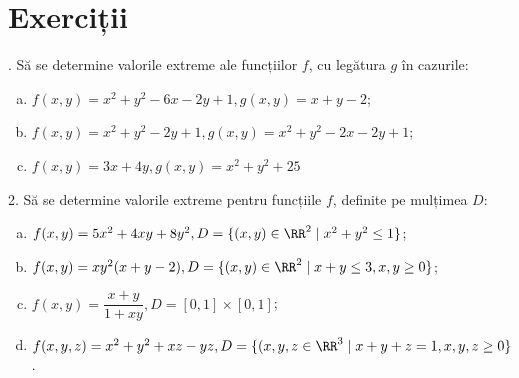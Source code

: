 
\section{Exerciții}

\indent{}. Să se determine valorile extreme ale funcțiilor $ f $,
cu legătura $ g $ în cazurile:
\begin{enumerate}[(a)]
\item $ f(x, y) = x^2 + y^2 - 6x - 2y + 1, g(x, y) = x + y - 2 $;
\item $ f(x, y) = x^2 + y^2 - 2y + 1, g(x, y) = x^2 + y^2 - 2x - 2y + 1 $;
\item $ f(x, y) = 3x + 4y, g(x, y) = x^2 + y^2 + 25 $
\end{enumerate}

\vspace{1cm}

2. Să se determine valorile extreme pentru funcțiile $ f $, definite pe
mulțimea $ D $:
\begin{enumerate}[(a)]
\item $ f(x, y) = 5x^2 + 4xy + 8y^2, D = \{(x, y) \in \RR^2 \mid x^2 + y^2 \leq 1 \} $;
\item $ f(x, y) = xy^2(x + y - 2), D = \{(x, y) \in \RR^2 \mid x + y \leq 3, x, y \geq 0 \} $;
\item $ f(x, y) = \dfrac{x + y}{1 + xy}, D = [0, 1] \times [0, 1] $;
\item $ f(x, y, z) = x^2 + y^2 + xz - yz, D = \{(x, y, z \in \RR^3 \mid %
  x + y + z = 1, x, y, z \geq 0 \} $.
\end{enumerate}


